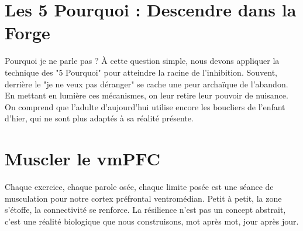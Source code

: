 \section{Les 5 Pourquoi : Descendre dans la Forge}
Pourquoi je ne parle pas ? À cette question simple, nous devons appliquer la technique des "5 Pourquoi" pour atteindre la racine de l'inhibition. Souvent, derrière le "je ne veux pas déranger" se cache une peur archaïque de l'abandon. En mettant en lumière ces mécanismes, on leur retire leur pouvoir de nuisance. On comprend que l'adulte d'aujourd'hui utilise encore les boucliers de l'enfant d'hier, qui ne sont plus adaptés à sa réalité présente.

\section{Muscler le vmPFC}
Chaque exercice, chaque parole osée, chaque limite posée est une séance de musculation pour notre cortex préfrontal ventromédian. Petit à petit, la zone s'étoffe, la connectivité se renforce. La résilience n'est pas un concept abstrait, c'est une réalité biologique que nous construisons, mot après mot, jour après jour.
